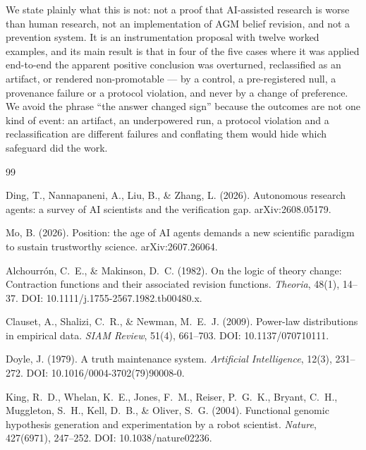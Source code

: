 \documentclass[11pt]{article}
\begin{document}
We state plainly what this is not: not a proof that AI-assisted research is
worse than human research, not an implementation of AGM belief revision,
and not a prevention system. It is an instrumentation proposal with twelve
worked examples, and its main result is that in four of the five cases where
it was applied end-to-end the apparent positive conclusion was overturned,
reclassified as an artifact, or rendered non-promotable --- by a control, a
pre-registered null, a provenance failure or a protocol violation, and never
by a change of preference. We avoid the phrase ``the answer changed sign''
because the outcomes are not one kind of event: an artifact, an underpowered
run, a protocol violation and a reclassification are different failures and
conflating them would hide which safeguard did the work.

\begin{thebibliography}{99}

Ding, T., Nannapaneni, A., Liu, B., \& Zhang, L. (2026).
\newblock Autonomous research agents: a survey of AI scientists and the
verification gap.
\newblock arXiv:2608.05179.

Mo, B. (2026).
\newblock Position: the age of AI agents demands a new scientific paradigm to
sustain trustworthy science.
\newblock arXiv:2607.26064.

Alchourr\'on, C.~E., \& Makinson, D.~C. (1982).
\newblock On the logic of theory change: Contraction functions and their
associated revision functions.
\newblock \emph{Theoria}, 48(1), 14--37.
\newblock DOI: 10.1111/j.1755-2567.1982.tb00480.x.

Clauset, A., Shalizi, C.~R., \& Newman, M.~E.~J. (2009).
\newblock Power-law distributions in empirical data.
\newblock \emph{SIAM Review}, 51(4), 661--703.
\newblock DOI: 10.1137/070710111.

Doyle, J. (1979).
\newblock A truth maintenance system.
\newblock \emph{Artificial Intelligence}, 12(3), 231--272.
\newblock DOI: 10.1016/0004-3702(79)90008-0.

King, R.~D., Whelan, K.~E., Jones, F.~M., Reiser, P.~G.~K., Bryant, C.~H.,
Muggleton, S.~H., Kell, D.~B., \& Oliver, S.~G. (2004).
\newblock Functional genomic hypothesis generation and experimentation by a
robot scientist.
\newblock \emph{Nature}, 427(6971), 247--252.
\newblock DOI: 10.1038/nature02236.


\end{thebibliography}
\end{document}
